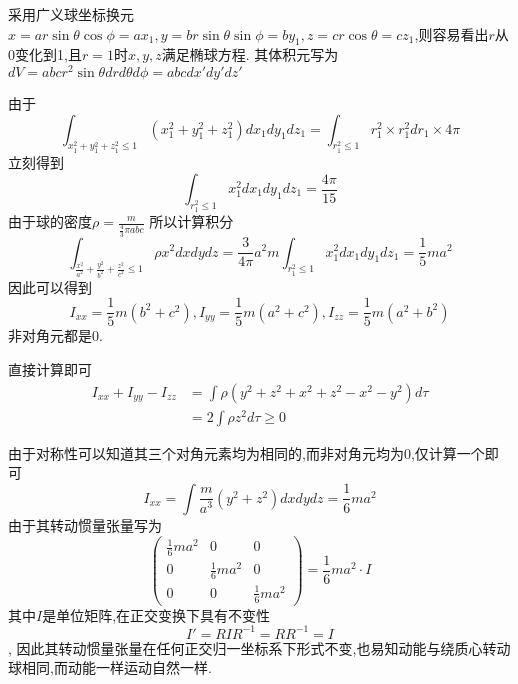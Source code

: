 \begin{solution}
    采用广义球坐标换元$x=ar\sin\theta\cos\phi=ax_1,y=br\sin\theta\sin\phi=by_1,z=cr\cos\theta=cz_1$,则容易看出$r$从0变化到1,且$r=1$时$x,y,z$满足椭球方程.
    其体积元写为$dV=abcr^2\sin\theta dr d\theta d\phi=abcdx'dy'dz'$
    
    由于
    $$\int_{x_1^2+y_1^2+z_1^2\leq1}(x_1^2+y_1^2+z_1^2)dx_1dy_1dz_1=\int_{r_1^2\leq1}r_1^2\times r_1^2dr_1\times4\pi$$
    立刻得到
    $$\int_{r_1^2\leq1}x_1^2dx_1dy_1dz_1=\frac{4\pi}{15}$$
    由于球的密度$\rho=\frac{m}{\frac43\pi abc}$
    所以计算积分
    $$\int_{\frac{x^2}{a^2}+\frac{y^2}{b^2}+\frac{z^2}{c^2}\leq1}\rho x^2dxdydz=\frac{3}{4\pi}a^2m\int_{r_1^2\leq1}x_1^2dx_1dy_1dz_1=\frac{1}{5}ma^2$$
    因此可以得到
    $$I_{xx}=\frac15m(b^2+c^2),I_{yy}=\frac15m(a^2+c^2),I_{zz}=\frac15m(a^2+b^2)$$
    非对角元都是0.
\end{solution}

\begin{solution}
    直接计算即可
    \begin{align*}
        I_{xx}+I_{yy}-I_{zz}&=\int \rho(y^2+z^2+x^2+z^2-x^2-y^2)d\tau\\&=2\int\rho z^2d\tau\geq0
    \end{align*}
\end{solution}

\begin{solution}
    由于对称性可以知道其三个对角元素均为相同的,而非对角元均为0,仅计算一个即可
    $$I_{xx}=\int\frac{m}{a^3}(y^2+z^2)dxdydz=\frac16ma^2$$
    由于其转动惯量张量写为
    $$\begin{pmatrix}
        \frac16ma^2&0&0\\
        0&\frac16ma^2&0\\
        0&0&\frac16ma^2
    \end{pmatrix}=\frac16ma^2\cdot I$$
    其中$I$是单位矩阵,在正交变换下具有不变性
    $$I'=RIR^{-1}=RR^{-1}=I$$,
    因此其转动惯量张量在任何正交归一坐标系下形式不变,也易知动能与绕质心转动球相同,而动能一样运动自然一样.
\end{solution}

